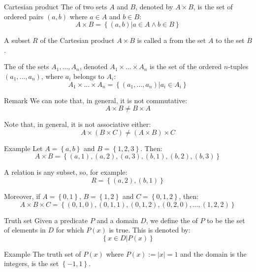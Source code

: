 \documentclass[a4paper]{article}
\begin{document}
\begin{parag}{Cartesian product}
    The  of two sets $A$ and $B$, denoted by $A \times B$, is the set of ordered pairs $\left(a, b\right)$ where $a \in A$ and $b \in B$:
    \[A \times B = \left\{\left(a, b\right) | a \in A \land b \in B\right\}\]

    A subset $R$ of the Cartesian product $A \times B$ is called a  from the set $A$ to the set $B$.

    The  of the sets $A_1, \ldots, A_n$, denoted $A_1 \times \ldots \times A_n$ is the set of the ordered $n$-tuples $\left(a_1, \ldots, a_n\right)$, where $a_i$ belongs to $A_i$:
    \[A_1 \times \ldots \times A_n = \left\{\left(a_1, \ldots, a_n\right) | a_i \in A_i\right\}\]

    \begin{subparag}{Remark}
        We can note that, in general, it is not commutative:
        \[A \times B \neq B \times A\]

        Note that, in general, it is not associative either:
        \[A \times \left(B \times C\right) \neq \left(A \times B\right) \times C\]
    \end{subparag}

    \begin{subparag}{Example}
        Let $A = \left\{a, b\right\}$ and $B = \left\{1, 2, 3\right\}$. Then:
        \[A \times B = \left\{\left(a, 1\right), \left(a,2\right), \left(a,3\right), \left(b, 1\right), \left(b,2\right), \left(b,3\right)\right\}\]

        A relation is any subset, so, for example:
        \[R = \left\{\left(a,2\right), \left(b,1\right)\right\}\]

        Moreover, if $A = \left\{0, 1\right\}$, $B = \left\{1, 2\right\}$ and $C = \left\{0, 1, 2\right\}$, then:
        \[A \times B \times C = \left\{\left(0, 1,0\right), \left(0, 1, 1\right), \left(0, 1, 2\right), \left(0, 2, 0\right), \ldots, \left(1, 2, 2\right)\right\}\]
    \end{subparag}
\end{parag}

\begin{parag}{Truth set}
    Given a predicate $P$ and a domain $D$, we define the  of $P$ to be the set of elements in $D$ for which $P\left(x\right)$ is true. This is denoted by:
    \[\left\{x \in D | P\left(x\right)\right\}\]

    \begin{subparag}{Example}
        The truth set of $P\left(x\right)$ where $P\left(x\right) := \left|x\right| = 1$ and the domain is the integers, is the set $\left\{-1, 1\right\}$.
    \end{subparag}
\end{parag}
\end{document}
